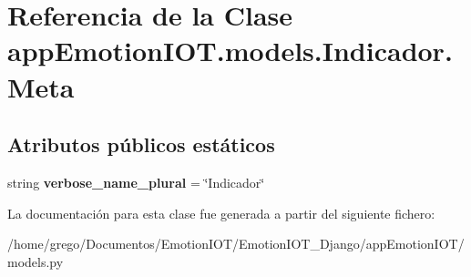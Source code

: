 \hypertarget{classappEmotionIOT_1_1models_1_1Indicador_1_1Meta}{}\section{Referencia de la Clase app\+Emotion\+I\+O\+T.\+models.\+Indicador.\+Meta}
\label{classappEmotionIOT_1_1models_1_1Indicador_1_1Meta}
\subsection*{Atributos públicos estáticos}
\begin{DoxyCompactItemize}
\item 
string {\bfseries verbose\+\_\+name\+\_\+plural} = \char`\"{}Indicador\char`\"{}\hypertarget{classappEmotionIOT_1_1models_1_1Indicador_1_1Meta_ac2d0a047bd6e27dbaa6db268cf1e0e60}{}\label{classappEmotionIOT_1_1models_1_1Indicador_1_1Meta_ac2d0a047bd6e27dbaa6db268cf1e0e60}

\end{DoxyCompactItemize}


La documentación para esta clase fue generada a partir del siguiente fichero\+:\begin{DoxyCompactItemize}
\item 
/home/grego/\+Documentos/\+Emotion\+I\+O\+T/\+Emotion\+I\+O\+T\+\_\+\+Django/app\+Emotion\+I\+O\+T/models.\+py\end{DoxyCompactItemize}
